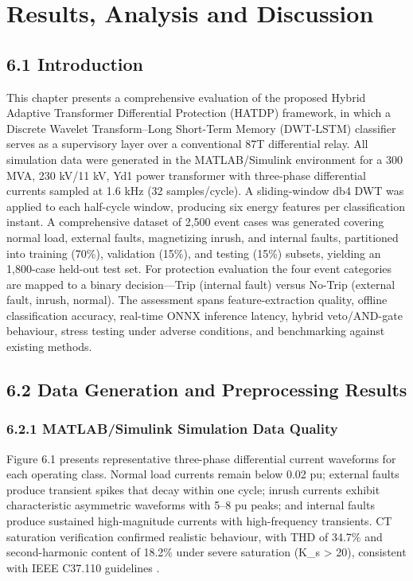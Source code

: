 \chapter{Results, Analysis and Discussion}
\label{ch:chapter6}


\section{6.1  Introduction}
This chapter presents a comprehensive evaluation of the proposed Hybrid Adaptive Transformer Differential Protection (HATDP) framework, in which a Discrete Wavelet Transform--Long Short-Term Memory (DWT-LSTM) classifier serves as a supervisory layer over a conventional 87T differential relay. All simulation data were generated in the MATLAB/Simulink environment for a 300 MVA, 230 kV/11 kV, Yd1 power transformer with three-phase differential currents sampled at 1.6 kHz (32 samples/cycle). A sliding-window db4 DWT was applied to each half-cycle window, producing six energy features per classification instant. A comprehensive dataset of 2,500 event cases was generated covering normal load, external faults, magnetizing inrush, and internal faults, partitioned into training (70\%), validation (15\%), and testing (15\%) subsets, yielding an 1,800-case held-out test set. For protection evaluation the four event categories are mapped to a binary decision---Trip (internal fault) versus No-Trip (external fault, inrush, normal). The assessment spans feature-extraction quality, offline classification accuracy, real-time ONNX inference latency, hybrid veto/AND-gate behaviour, stress testing under adverse conditions, and benchmarking against existing methods.


\section{6.2  Data Generation and Preprocessing Results}

\subsection{6.2.1  MATLAB/Simulink Simulation Data Quality}
Figure 6.1 presents representative three-phase differential current waveforms for each operating class. Normal load currents remain below 0.02 pu; external faults produce transient spikes that decay within one cycle; inrush currents exhibit characteristic asymmetric waveforms with 5--8 pu peaks; and internal faults produce sustained high-magnitude currents with high-frequency transients. CT saturation verification confirmed realistic behaviour, with THD of 34.7\% and second-harmonic content of 18.2\% under severe saturation (K\_s > 20), consistent with IEEE C37.110 guidelines \cite{ref14}.

